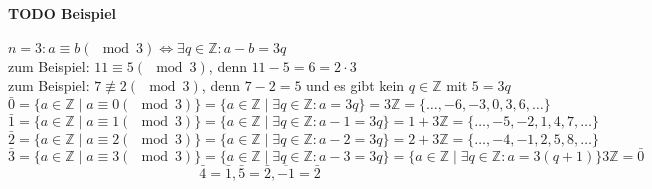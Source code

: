 \documentclass[a4paper]{scrartcl}
\begin{document}
\paragraph{{\bfseries\sffamily TODO} Beispiel}
\label{sec-3-1-7-3}
$n = 3: a\equiv b (\mod 3) \Leftrightarrow \exists q\in\mathbb{Z}: a - b = 3 q$ \\
     zum Beispiel: $11 \equiv 5(\mod 3)$, denn $11 - 5 = 6 = 2 \cdot 3$ \\
     zum Beispiel: $7 \not\equiv 2(\mod 3)$, denn $7 - 2 = 5$ und es gibt kein $q\in\mathbb{Z}$ mit $5 = 3 q$
\[\bar 0 = \{a\in\mathbb{Z}\mid a \equiv 0 (\mod 3)\} = \{a\in\mathbb{Z} \mid  \exists q\in\mathbb{Z}: a = 3q\} = 3\mathbb{Z} = \{\ldots,-6,-3,0,3,6,\ldots\}\]
\[\bar 1 = \{a\in\mathbb{Z}\mid a \equiv 1 (\mod 3)\} = \{a\in\mathbb{Z} \mid  \exists q\in\mathbb{Z}: a - 1 = 3q\} = 1 + 3\mathbb{Z} = \{\ldots,-5,-2,1,4,7,\ldots\}\]
\[\bar 2 = \{a\in\mathbb{Z}\mid a \equiv 2 (\mod 3)\} = \{a\in\mathbb{Z} \mid  \exists q\in\mathbb{Z}: a - 2 = 3q\} = 2 + 3\mathbb{Z} = \{\ldots,-4,-1,2,5,8,\ldots\}\]
\[\bar 3 = \{a\in\mathbb{Z}\mid a \equiv 3 (\mod 3)\} = \{a\in\mathbb{Z} \mid  \exists q\in\mathbb{Z}: a - 3 = 3q\} = \{a\in\mathbb{Z}\mid \exists q\in\mathbb{Z}:a=3(q + 1)\}3\mathbb{Z} = \bar 0\]
\[\bar 4 = \bar 1,\bar 5 = \bar 2,\overline{-1} = \bar 2\]
\end{document}

